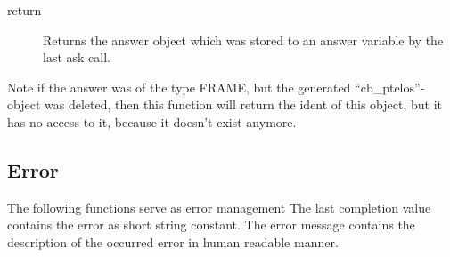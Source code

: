 	\begin{method}{ }
	  \begin{description}
	    \item[ return]
		Returns the answer object which was stored 
		 to an answer variable by the last ask call. 
	  \end{description}
	Note if the answer was of the type FRAME, but the generated 
	 ``cb\_ptelos''-object was deleted, 
	 then this function will return the ident of this object,
	 but it has no access to it, because it doesn't exist anymore.
	\end{method}
  \subsection{Error} 
   \label{manageErrors}
	The following functions serve as error management
	The last completion value contains the error as short string constant.
	The error message contains the description of the occurred error in
	 human readable manner. \\
